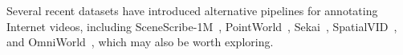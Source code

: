 Several recent datasets have introduced alternative pipelines for annotating Internet videos, including SceneScribe-1M~\cite{wang26scenescribe-1m:}, PointWorld~\cite{huang26pointworld:}, Sekai~\cite{li25sekai:}, SpatialVID~\cite{wang25spatialvid:}, and OmniWorld~\cite{zhou26omniworld:}, which may also be worth exploring.




